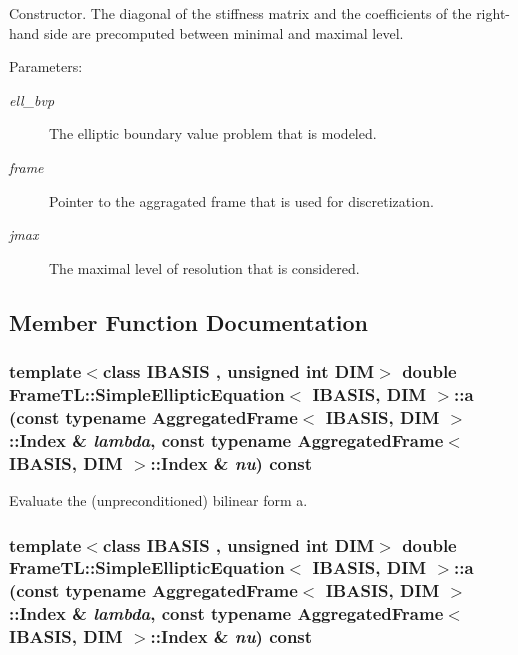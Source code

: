 Constructor. The diagonal of the stiffness matrix and the coefficients of the right-hand side are precomputed between minimal and maximal level.

\begin{Desc}
\item[Parameters:]
\begin{description}
\item[{\em ell\_\-bvp}]The elliptic boundary value problem that is modeled. \item[{\em frame}]Pointer to the aggragated frame that is used for discretization. \item[{\em jmax}]The maximal level of resolution that is considered. \end{description}
\end{Desc}


\subsection{Member Function Documentation}
\hypertarget{classFrameTL_1_1SimpleEllipticEquation_472d73dad42588a253df3c51a8ed08c4}{
\subsubsection[{a}]{\setlength{\rightskip}{0pt plus 5cm}template$<$class IBASIS , unsigned int DIM$>$ double {\bf FrameTL::SimpleEllipticEquation}$<$ IBASIS, DIM $>$::a (const typename {\bf AggregatedFrame}$<$ IBASIS, DIM $>$::{\bf Index} \& {\em lambda}, \/  const typename {\bf AggregatedFrame}$<$ IBASIS, DIM $>$::{\bf Index} \& {\em nu}) const}}
\label{classFrameTL_1_1SimpleEllipticEquation_472d73dad42588a253df3c51a8ed08c4}


Evaluate the (unpreconditioned) bilinear form a. \hypertarget{classFrameTL_1_1SimpleEllipticEquation_472d73dad42588a253df3c51a8ed08c4}{
\subsubsection[{a}]{\setlength{\rightskip}{0pt plus 5cm}template$<$class IBASIS , unsigned int DIM$>$ double {\bf FrameTL::SimpleEllipticEquation}$<$ IBASIS, DIM $>$::a (const typename {\bf AggregatedFrame}$<$ IBASIS, DIM $>$::{\bf Index} \& {\em lambda}, \/  const typename {\bf AggregatedFrame}$<$ IBASIS, DIM $>$::{\bf Index} \& {\em nu}) const}}
\label{classFrameTL_1_1SimpleEllipticEquation_472d73dad42588a253df3c51a8ed08c4}


